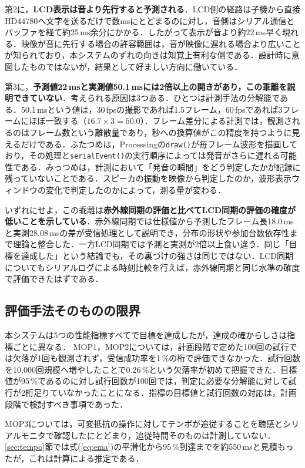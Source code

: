 \documentclass[uplatex,dvipdfmx]{jlreq}
\begin{document}
第2に，\textbf{LCD表示は音より先行すると予測される}．LCD側の経路は子機から直接HD44780へ文字を送るだけで数msにとどまるのに対し，音側はシリアル通信とバッファを経て約25\,ms余分にかかる．したがって表示が音より約22\,ms早く現れる．映像が音に先行する場合の許容範囲は，音が映像に遅れる場合より広いことが知られており\cite{kuwahara2019}，本システムのずれの向きは知覚上有利な側である．設計時に意図したものではないが，結果として好ましい方向に働いている．

第3に，\textbf{予測値22\,msと実測値50.1\,msには2倍以上の開きがあり，この乖離を説明できていない}．考えられる原因は3つある．ひとつは計測手法の分解能である．50.1\,msという値は，30\,fpsの撮影であれば1.5フレーム，60\,fpsであれば3フレームにほぼ一致する（$16.7 \times 3 = 50.0$）．フレーム差分による計測では，観測されるのはフレーム数という離散量であり，秒への換算値がこの精度を持つように見えるだけである．ふたつめは，Processingの\texttt{draw()}が毎フレーム波形を描画しており，その処理と\texttt{serialEvent()}の実行順序によっては発音がさらに遅れる可能性である．みっつめは，計測において「発音の瞬間」をどう判定したかが記録に残っていないことである．スピーカの振動を映像から判定したのか，波形表示ウィンドウの変化で判定したのかによって，測る量が変わる．

いずれにせよ，この乖離は\textbf{赤外線同期の評価と比べてLCD同期の評価の確度が低いことを示している}．赤外線同期では仕様値から予測したフレーム長18.0\,msと実測28.08\,msの差が受信処理として説明でき，分布の形状や参加台数依存性まで理論と整合した．一方LCD同期では予測と実測が2倍以上食い違う．同じ「目標を達成した」という結論でも，その裏づけの強さは同じではない．LCD同期についてもシリアルログによる時刻比較を行えば，赤外線同期と同じ水準の確度で評価できたはずである．

\subsection{評価手法そのものの限界}
\label{sec:disc-eval-limit}

本システムは5つの性能指標すべてで目標を達成したが，達成の確からしさは指標ごとに異なる．
MOP1，MOP2については，計画段階で定めた100回の試行では欠落が1回も観測されず，受信成功率を1\,\%の桁で評価できなかった．試行回数を10{,}000回規模へ増やしたことで0.26\,\%という欠落率が初めて把握できた．目標値が95\,\%であるのに対し試行回数が100回では，判定に必要な分解能に対して試行が2桁足りていなかったことになる．指標の目標値と試行回数の対応は，計画段階で検討すべき事項であった．

MOP3については，可変抵抗の操作に対してテンポが追従することを聴感とシリアルモニタで確認したにとどまり，追従時間そのものは計測していない．\ref{sec:tempo}節では式(\ref{eq:ema})の平滑化から95\,\%到達までを約550\,msと見積もったが，これは計算による推定である．
\end{document}
